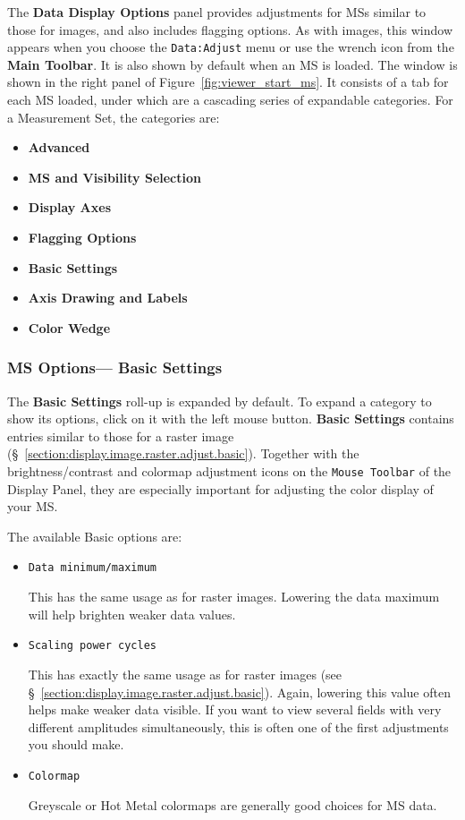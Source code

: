 The {\bf Data Display Options} panel provides adjustments for MSs
similar to those for images, and also includes flagging options.
As with images, this window appears when you choose the {\tt Data:Adjust}
menu or use the wrench icon from the {\bf Main Toolbar}. It is also shown
by default when an MS is loaded. The window is shown in the right panel
of Figure~\ref{fig:viewer_start_ms}.  It consists of a tab for each
MS loaded, under which are a cascading series of expandable
categories.  For a Measurement Set, the categories are:
\begin{itemize}
   \item {\bf Advanced}
   \item {\bf MS and Visibility Selection}
   \item {\bf Display Axes}
   \item {\bf Flagging Options}
   \item {\bf Basic Settings}
   \item {\bf Axis Drawing and Labels}
   \item {\bf Color Wedge}
\end{itemize}

\subsubsection{MS Options--- Basic Settings}
\label{section:display.ms.adjust.basic}

The {\bf Basic Settings} roll-up is expanded by
default.  To expand a category to show its options, click on it with
the left mouse button. {\bf Basic Settings} contains entries similar to
those for a raster image (\S~\ref{section:display.image.raster.adjust.basic}). 
Together with the brightness/contrast and colormap adjustment icons
on the {\tt Mouse Toolbar} of the Display Panel, they are especially
important for adjusting the color display of your MS.

The available Basic options are:

\begin{itemize}

\item {\tt Data minimum/maximum}

This has the same usage as for raster images.  
Lowering the data maximum will help brighten
weaker data values.

\item {\tt Scaling power cycles}

This has exactly the same usage as for raster images (see
\S~\ref{section:display.image.raster.adjust.basic}).  Again, lowering
this value often helps make weaker data visible.  If you want to view
several fields with very different amplitudes simultaneously, this is
often one of the first adjustments you should make.

\item {\tt Colormap}

Greyscale or Hot Metal colormaps are generally good choices for MS
data.

\end{itemize}



